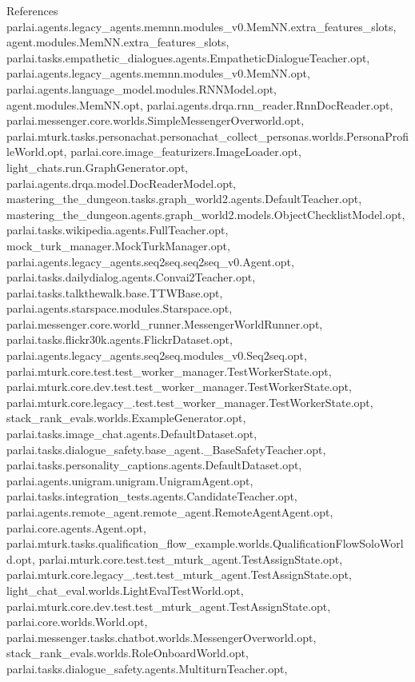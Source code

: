 References parlai.\+agents.\+legacy\+\_\+agents.\+memnn.\+modules\+\_\+v0.\+Mem\+N\+N.\+extra\+\_\+features\+\_\+slots, agent.\+modules.\+Mem\+N\+N.\+extra\+\_\+features\+\_\+slots, parlai.\+tasks.\+empathetic\+\_\+dialogues.\+agents.\+Empathetic\+Dialogue\+Teacher.\+opt, parlai.\+agents.\+legacy\+\_\+agents.\+memnn.\+modules\+\_\+v0.\+Mem\+N\+N.\+opt, parlai.\+agents.\+language\+\_\+model.\+modules.\+R\+N\+N\+Model.\+opt, agent.\+modules.\+Mem\+N\+N.\+opt, parlai.\+agents.\+drqa.\+rnn\+\_\+reader.\+Rnn\+Doc\+Reader.\+opt, parlai.\+messenger.\+core.\+worlds.\+Simple\+Messenger\+Overworld.\+opt, parlai.\+mturk.\+tasks.\+personachat.\+personachat\+\_\+collect\+\_\+personas.\+worlds.\+Persona\+Profile\+World.\+opt, parlai.\+core.\+image\+\_\+featurizers.\+Image\+Loader.\+opt, light\+\_\+chats.\+run.\+Graph\+Generator.\+opt, parlai.\+agents.\+drqa.\+model.\+Doc\+Reader\+Model.\+opt, mastering\+\_\+the\+\_\+dungeon.\+tasks.\+graph\+\_\+world2.\+agents.\+Default\+Teacher.\+opt, mastering\+\_\+the\+\_\+dungeon.\+agents.\+graph\+\_\+world2.\+models.\+Object\+Checklist\+Model.\+opt, parlai.\+tasks.\+wikipedia.\+agents.\+Full\+Teacher.\+opt, mock\+\_\+turk\+\_\+manager.\+Mock\+Turk\+Manager.\+opt, parlai.\+agents.\+legacy\+\_\+agents.\+seq2seq.\+seq2seq\+\_\+v0.\+Agent.\+opt, parlai.\+tasks.\+dailydialog.\+agents.\+Convai2\+Teacher.\+opt, parlai.\+tasks.\+talkthewalk.\+base.\+T\+T\+W\+Base.\+opt, parlai.\+agents.\+starspace.\+modules.\+Starspace.\+opt, parlai.\+messenger.\+core.\+world\+\_\+runner.\+Messenger\+World\+Runner.\+opt, parlai.\+tasks.\+flickr30k.\+agents.\+Flickr\+Dataset.\+opt, parlai.\+agents.\+legacy\+\_\+agents.\+seq2seq.\+modules\+\_\+v0.\+Seq2seq.\+opt, parlai.\+mturk.\+core.\+test.\+test\+\_\+worker\+\_\+manager.\+Test\+Worker\+State.\+opt, parlai.\+mturk.\+core.\+dev.\+test.\+test\+\_\+worker\+\_\+manager.\+Test\+Worker\+State.\+opt, parlai.\+mturk.\+core.\+legacy\+\_.\+test.\+test\+\_\+worker\+\_\+manager.\+Test\+Worker\+State.\+opt, stack\+\_\+rank\+\_\+evals.\+worlds.\+Example\+Generator.\+opt, parlai.\+tasks.\+image\+\_\+chat.\+agents.\+Default\+Dataset.\+opt, parlai.\+tasks.\+dialogue\+\_\+safety.\+base\+\_\+agent.\+\_\+\+Base\+Safety\+Teacher.\+opt, parlai.\+tasks.\+personality\+\_\+captions.\+agents.\+Default\+Dataset.\+opt, parlai.\+agents.\+unigram.\+unigram.\+Unigram\+Agent.\+opt, parlai.\+tasks.\+integration\+\_\+tests.\+agents.\+Candidate\+Teacher.\+opt, parlai.\+agents.\+remote\+\_\+agent.\+remote\+\_\+agent.\+Remote\+Agent\+Agent.\+opt, parlai.\+core.\+agents.\+Agent.\+opt, parlai.\+mturk.\+tasks.\+qualification\+\_\+flow\+\_\+example.\+worlds.\+Qualification\+Flow\+Solo\+World.\+opt, parlai.\+mturk.\+core.\+test.\+test\+\_\+mturk\+\_\+agent.\+Test\+Assign\+State.\+opt, parlai.\+mturk.\+core.\+legacy\+\_.\+test.\+test\+\_\+mturk\+\_\+agent.\+Test\+Assign\+State.\+opt, light\+\_\+chat\+\_\+eval.\+worlds.\+Light\+Eval\+Test\+World.\+opt, parlai.\+mturk.\+core.\+dev.\+test.\+test\+\_\+mturk\+\_\+agent.\+Test\+Assign\+State.\+opt, parlai.\+core.\+worlds.\+World.\+opt, parlai.\+messenger.\+tasks.\+chatbot.\+worlds.\+Messenger\+Overworld.\+opt, stack\+\_\+rank\+\_\+evals.\+worlds.\+Role\+Onboard\+World.\+opt, parlai.\+tasks.\+dialogue\+\_\+safety.\+agents.\+Multiturn\+Teacher.\+opt, 